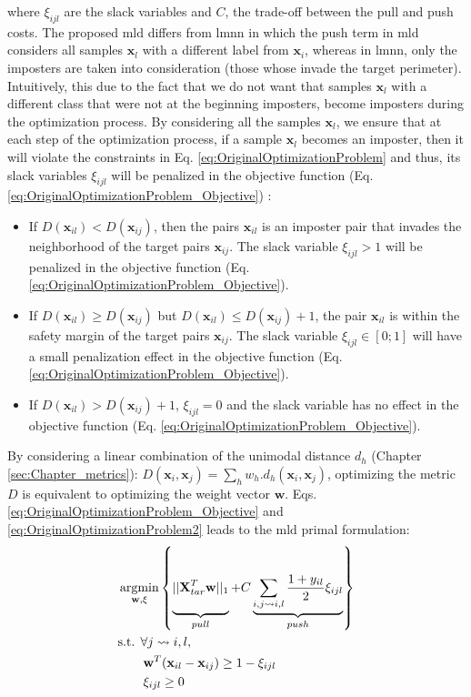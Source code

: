 \noindent where $\xi_{ijl}$ are the slack variables and $C$, the trade-off between the pull and push costs. The proposed {\sc mld} differs from {\sc lmnn} in which the push term in {\sc mld} considers all samples $\textbf{x}_l$ with a different label from $\textbf{x}_i$, whereas in {\sc lmnn}, only the imposters are taken into consideration (those whose invade the target perimeter). Intuitively, this due to the fact that we do not want that samples $\textbf{x}_l$ with a different class that were not at the beginning imposters, become imposters during the optimization process. By considering all the samples $\textbf{x}_l$, we ensure that at each step of the optimization process, if a sample $\textbf{x}_l$ becomes an imposter, then it will violate the constraints in Eq. \ref{eq:OriginalOptimizationProblem} and thus, its slack variables $\xi_{ijl}$ will be penalized in the objective function (Eq. \ref{eq:OriginalOptimizationProblem_Objective}) :
\begin{itemize}
	\item If $D(\textbf{x}_{il}) < D(\textbf{x}_{ij})$, then the pairs $\textbf{x}_{il}$ is an imposter pair that invades the neighborhood of the target pairs $\textbf{x}_{ij}$. The slack variable  $\xi_{ijl} > 1$ will be penalized in the objective function (Eq. \ref{eq:OriginalOptimizationProblem_Objective}). 
	\item If $D(\textbf{x}_{il}) \geq D(\textbf{x}_{ij})$ but $D(\textbf{x}_{il}) \leq D(\textbf{x}_{ij})+1$, the pair $\textbf{x}_{il}$ is within the safety margin of the target pairs $\textbf{x}_{ij}$. The slack variable $ \xi_{ijl} \in [0;1]$ will have a small penalization effect in the objective function (Eq. \ref{eq:OriginalOptimizationProblem_Objective}).
	\item If $D(\textbf{x}_{il}) > D(\textbf{x}_{ij}) +1$, $\xi_{ijl} = 0$ and the slack variable has no effect in the objective function (Eq. \ref{eq:OriginalOptimizationProblem_Objective}).
\end{itemize}
\noindent By considering a linear combination of the unimodal distance $d_h$ (Chapter \ref{sec:Chapter_metrics}): $D(\textbf{x}_i,\textbf{x}_j) = \sum_h w_h.d_h(\textbf{x}_i,\textbf{x}_j)$, optimizing the metric $D$ is equivalent to optimizing the weight vector $\textbf{w}$. Eqs. \ref{eq:OriginalOptimizationProblem_Objective} and \ref{eq:OriginalOptimizationProblem2} leads to the {\sc mld} primal formulation:
		\begin{align}
		&\displaystyle 		\argmin_{\textbf{w},\xi}
		\left\lbrace \underbrace{
		\vphantom{ \sum\limits_{i,j \rightsquigarrow i,l} \frac{1+y_{il}}{2} \xi_{ijl} }
			||\textbf{X}_{tar}^T \textbf{w}||_1	
		}_{pull}					
		+	
		C \underbrace{				
			\sum\limits_{i,j \rightsquigarrow i,l} \frac{1+y_{il}}{2} \xi_{ijl}
		}_{push} \right\rbrace \label{eq:MMLPrimal} \\
		&\text{s.t.  } \forall j \rightsquigarrow i,l, \nonumber \\
		& \qquad \textbf{w}^T(\textbf{x}_{il}-\textbf{x}_{ij}) \geq 1-\xi_{ijl} \label{eq:MMLPrimal_constraint1} \\
		& \qquad \xi_{ijl} \geq 0
		\label{eq:MMLPrimal_constraint2}
		\end{align}
